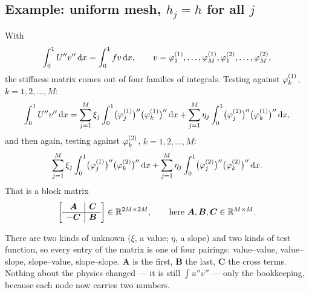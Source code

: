 \subsection*{Example: uniform mesh, $h_{j}=h$ for all $j$}

With
\begin{equation}\label{eq:l12fem}
  \int_0^1 U''v''\,\mathrm{d} x=\int_0^1 f v\,\mathrm{d} x,
  \qquad v=\varphi_{1}^{(1)},\dots,\varphi_{M}^{(1)},
            \varphi_{1}^{(2)},\dots,\varphi_{M}^{(2)} ,
\end{equation}
the stiffness matrix comes out of four families of integrals. Testing against
$\varphi_{k}^{(1)}$, $k=1,2,\dots,M$:
\begin{equation}\label{eq:l12rowa}
  \int_0^1 U''v''\,\mathrm{d} x
  =\sum_{j=1}^{M}\xi_{j}\int_0^1\bigl(\varphi_{j}^{(1)}\bigr)''
     \bigl(\varphi_{k}^{(1)}\bigr)''\,\mathrm{d} x
  +\sum_{j=1}^{M}\eta_{j}\int_0^1\bigl(\varphi_{j}^{(2)}\bigr)''
     \bigl(\varphi_{k}^{(1)}\bigr)''\,\mathrm{d} x ,
\end{equation}
and then again, testing against $\varphi_{k}^{(2)}$, $k=1,2,\dots,M$:
\begin{equation}\label{eq:l12rowb}
  \sum_{j=1}^{M}\xi_{j}\int_0^1\bigl(\varphi_{j}^{(1)}\bigr)''
     \bigl(\varphi_{k}^{(2)}\bigr)''\,\mathrm{d} x
  +\sum_{j=1}^{M}\eta_{j}\int_0^1\bigl(\varphi_{j}^{(2)}\bigr)''
     \bigl(\varphi_{k}^{(2)}\bigr)''\,\mathrm{d} x .
\end{equation}
That is a block matrix
\begin{equation}\label{eq:l12block}
  \left[\begin{array}{c|c}
    \bm{A} & \bm{C}\\\hline
    -\bm{C} & \bm{B}
  \end{array}\right]\in\mathbb{R}^{2M\times2M},
  \qquad\text{here }\bm{A},\bm{B},\bm{C}\in\mathbb{R}^{M\times M}.
\end{equation}

\begin{intuition}
There are two kinds of unknown ($\xi$, a value; $\eta$, a slope) and two kinds
of test function, so every entry of the matrix is one of four pairings:
value--value, value--slope, slope--value, slope--slope. $\bm{A}$ is the first,
$\bm{B}$ the last, $\bm{C}$ the cross terms. Nothing about the physics changed
--- it is still $\int u''v''$ --- only the bookkeeping, because each node now
carries two numbers.
\end{intuition}

